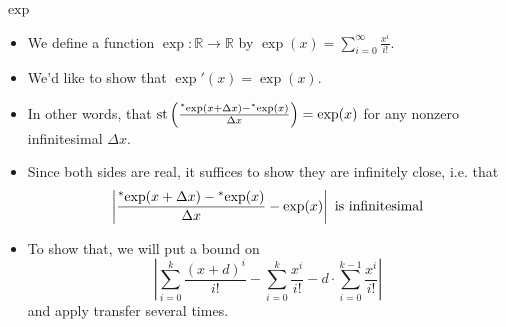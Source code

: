 \documentclass{beamer}
\theoremstyle{plain}
\theoremstyle{definition}
\newcommand{\stp}[1]{\st\left(#1\right)}
\newcommand{\reals}{\mathbb{R}}
\newcommand{\hr}[1]{\prescript{*}{}{#1}}
\DeclareMathOperator{\st}{st}
\begin{document}
\begin{frame}{$\exp$}
\begin{itemize}
\item We define a function $\exp: \reals \to \reals$ by $\exp(x) = \sum_{i=0}^\infty \frac{x^i}{i!}$.
\item We'd like to show that $\exp'(x) = \exp(x)$.
\item In other words, that $\stp{\frac{\hr{\exp}(x + \Delta x) - \hr{\exp}(x)}{\Delta x}} = \exp(x)$ for any nonzero infinitesimal $\Delta x$.
\item Since both sides are real, it suffices to show they are infinitely close, i.e. that
\[ \left| \frac{\hr{\exp}(x + \Delta x) - \hr{\exp}(x)}{\Delta x} - \exp(x) \right| \text{ is infinitesimal}\]
\item To show that, we will put a bound on
\[ \left| \sum_{i=0}^k \frac{(x+d)^i}{i!} - \sum_{i=0}^k \frac{x^i}{i!} - d \cdot \sum_{i=0}^{k-1} \frac{x^i}{i!} \right| \]
and apply transfer several times.
\end{itemize}
\end{frame}
\end{document}
